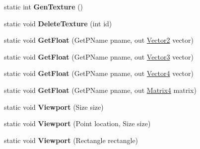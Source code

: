 \begin{DoxyCompactItemize}
\item 
\hypertarget{class_open_t_k_1_1_graphics_1_1_e_s20_1_1_g_l_aa87c09a0ca9026de83d95b40e640303e}{static int {\bfseries Gen\-Texture} ()}\label{class_open_t_k_1_1_graphics_1_1_e_s20_1_1_g_l_aa87c09a0ca9026de83d95b40e640303e}

\item 
\hypertarget{class_open_t_k_1_1_graphics_1_1_e_s20_1_1_g_l_a2d6c16d42a03f7d38032f09ec2ab1578}{static void {\bfseries Delete\-Texture} (int id)}\label{class_open_t_k_1_1_graphics_1_1_e_s20_1_1_g_l_a2d6c16d42a03f7d38032f09ec2ab1578}

\item 
\hypertarget{class_open_t_k_1_1_graphics_1_1_e_s20_1_1_g_l_a9e98b58844d18b22dcf60620c42aea7f}{static void {\bfseries Get\-Float} (Get\-P\-Name pname, out \hyperlink{struct_open_t_k_1_1_vector2}{Vector2} vector)}\label{class_open_t_k_1_1_graphics_1_1_e_s20_1_1_g_l_a9e98b58844d18b22dcf60620c42aea7f}

\item 
\hypertarget{class_open_t_k_1_1_graphics_1_1_e_s20_1_1_g_l_ad252c4ce7dc36fb6ff6751eaf15d0e3b}{static void {\bfseries Get\-Float} (Get\-P\-Name pname, out \hyperlink{struct_open_t_k_1_1_vector3}{Vector3} vector)}\label{class_open_t_k_1_1_graphics_1_1_e_s20_1_1_g_l_ad252c4ce7dc36fb6ff6751eaf15d0e3b}

\item 
\hypertarget{class_open_t_k_1_1_graphics_1_1_e_s20_1_1_g_l_a6d9b0d4287b9d709baa58d0c88ad17b0}{static void {\bfseries Get\-Float} (Get\-P\-Name pname, out \hyperlink{struct_open_t_k_1_1_vector4}{Vector4} vector)}\label{class_open_t_k_1_1_graphics_1_1_e_s20_1_1_g_l_a6d9b0d4287b9d709baa58d0c88ad17b0}

\item 
\hypertarget{class_open_t_k_1_1_graphics_1_1_e_s20_1_1_g_l_ac9cccaf266570502ac89e755833a05b3}{static void {\bfseries Get\-Float} (Get\-P\-Name pname, out \hyperlink{struct_open_t_k_1_1_matrix4}{Matrix4} matrix)}\label{class_open_t_k_1_1_graphics_1_1_e_s20_1_1_g_l_ac9cccaf266570502ac89e755833a05b3}

\item 
\hypertarget{class_open_t_k_1_1_graphics_1_1_e_s20_1_1_g_l_a85310d03f1d7ec8e6bff5bcc56678803}{static void {\bfseries Viewport} (Size size)}\label{class_open_t_k_1_1_graphics_1_1_e_s20_1_1_g_l_a85310d03f1d7ec8e6bff5bcc56678803}

\item 
\hypertarget{class_open_t_k_1_1_graphics_1_1_e_s20_1_1_g_l_ad79a8164b7b02c7dbce5d61b265724c3}{static void {\bfseries Viewport} (Point location, Size size)}\label{class_open_t_k_1_1_graphics_1_1_e_s20_1_1_g_l_ad79a8164b7b02c7dbce5d61b265724c3}

\item 
\hypertarget{class_open_t_k_1_1_graphics_1_1_e_s20_1_1_g_l_a4dfb2111e1cd89dffd36739d9a61e0e7}{static void {\bfseries Viewport} (Rectangle rectangle)}\label{class_open_t_k_1_1_graphics_1_1_e_s20_1_1_g_l_a4dfb2111e1cd89dffd36739d9a61e0e7}

\end{DoxyCompactItemize}

